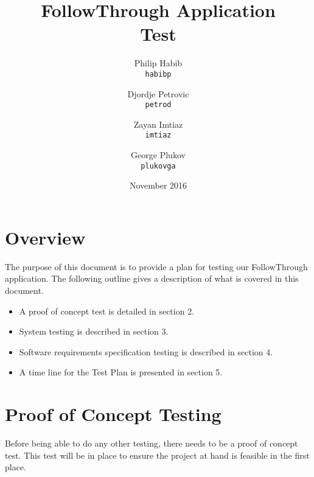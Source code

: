 \documentclass{article}
\begin{document}
\title{\textbf{FollowThrough Application} \\
 Test}
\author{
  Philip Habib\\ \texttt{habibp} \and Djordje Petrovic \\ \texttt{petrod} \and Zayan Imtiaz\\ \texttt{imtiaz} \and George Plukov\\ \texttt{plukovga}
}

\date{November 2016}

\maketitle

\newpage
\tableofcontents
\newpage

\section{Overview}
The purpose of this document is to provide a plan for testing our FollowThrough application. The following outline gives a description of what is covered in this document. 

\begin{itemize}
    \item A proof of concept test is detailed in section 2. 
    \item System testing is described in section 3. 
    \item Software requirements specification testing is described in section 4. 
    \item A time line for the Test Plan is presented in section 5. 
\end{itemize}

\section{Proof of Concept Testing}
Before being able to do any other testing, there needs to be a proof of concept test. This test will be in place to ensure the project at hand is feasible in the first place.
\end{document}
